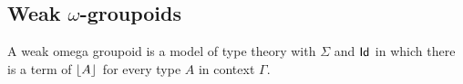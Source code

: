 \begin{comment}
\begin{defn}
A function $f:\prd{x:\terms{A}}\terms{\subst{x}{P}}$ is said to be \emph{continuous}
if there is a term of type
\begin{equation*}
\prd{x,y:\terms{A}}\terms{\subst{\ctxwk{A}{\mathcal{T}rans_{x,y}}}{\ctxwk{\idtypevar{A}}{\idtypevar{\subst{y}{P}}}}}.
\end{equation*}
\end{defn}

\begin{lem}
If all functions are ``continuous mappings of terms'' then types without terms
are empty, i.e.\ we have
\begin{equation*}
(\terms{A}\to\emptyt)\to\terms{A\to\emptyt^\mfGraph}
\end{equation*}
\end{lem}

\begin{proof}
Any function from a type without terms is vacuously continuous.
\end{proof}

We will see that in the graph model functions are not just continuous mappings
of terms, since there is a graph $\tilde{\emptyt}$ which has no terms but which
differs from the empty graph nevertheless.

\begin{desiderata}
The following may relate to functions being continuous mappings of terms (it
seems to be a very strong condition):
\begin{enumerate}
\item We have the adjunctions $\tfcolim\dashv\Delta\dashv\tflim$ in which the
two monads are idempotent (we don't even have the adjunctions for $\mfGraph$).
\item $\eqv{\terms{\Omega}}{\ctx}$
\end{enumerate}
We also need to check whether all functions in the reflexive graphs have this
property (if not, ditch this section).
\end{desiderata}
\end{comment}

\subsection*{Weak $\omega$-groupoids}

A weak omega groupoid is a model of type theory with $\Sigma$ and $\mathsf{Id}_{}$
in which there is a term of $\lfloor A \rfloor^{}$ for every type $A$ in context $\Gamma$.
